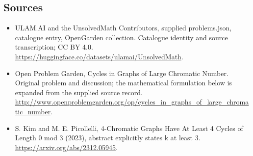 \documentclass[11pt,a4paper]{article}
\begin{document}
\subsection{Sources}
\begin{itemize}
\item[S1] ULAM.AI and the UnsolvedMath Contributors, supplied problems.json, catalogue entry, OpenGarden collection. Catalogue identity and source transcription; CC BY 4.0.
\url{https://huggingface.co/datasets/ulamai/UnsolvedMath}.
\item[S2] Open Problem Garden, Cycles in Graphs of Large Chromatic Number. Original problem and discussion; the mathematical formulation below is expanded from the supplied source record.
\url{http://www.openproblemgarden.org/op/cycles_in_graphs_of_large_chromatic_number}.
\item[S3] S. Kim and M. E. Picollelli, 4-Chromatic Graphs Have At Least 4 Cycles of Length 0 mod 3 (2023), abstract explicitly states k at least 3.
\url{https://arxiv.org/abs/2312.05945}.
\end{itemize}
\end{document}
